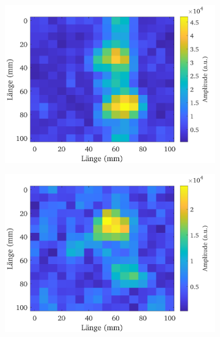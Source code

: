\documentclass[../../main.tex]{subfiles}
\begin{document}
        \begin{figure}[H]
            \begin{subfigure}[c]{0.5\textwidth}
                \includegraphics[width=\linewidth]{Bilddateien/13/YZ-4000-100/Fig_1}
                \label{fig:MRI_2D_YZ_4000_100}
            \end{subfigure}
            \begin{subfigure}[c]{0.5\textwidth}
                \includegraphics[width=\linewidth]{Bilddateien/13/YZ-500-100/Fig_1}
                \label{fig:MRI_2D_YZ_500_100}

\end{subfigure}
\end{figure}
\end{document}
